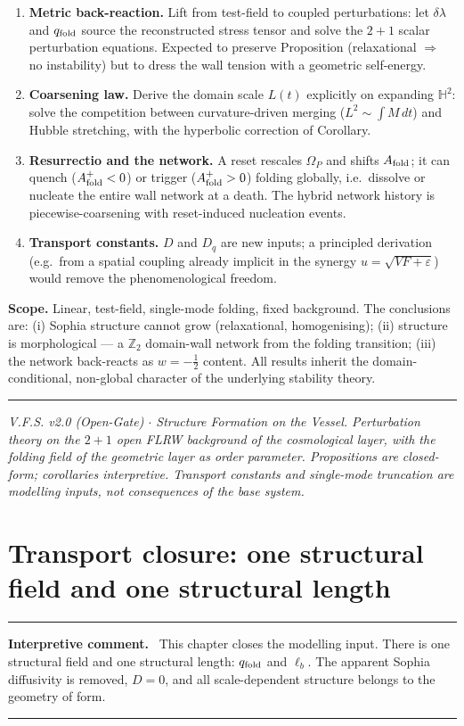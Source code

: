 \documentclass[11pt,a4paper]{article}
\newcommand{\Op}{\Omega_P}
\newcommand{\Hh}{\mathbb{H}^2}
\newcommand{\qf}{q_{\rm fold}}
\newcommand{\Af}{A_{\rm fold}}
\newcommand{\dlam}{\delta\lambda}
\newenvironment{commentbox}[1]{\begin{center}\begin{minipage}{0.90\textwidth}\hrule\vspace{0.45em}\textbf{#1.}\ }{\vspace{0.45em}\hrule\end{minipage}\end{center}}
\theoremstyle{plain}
\theoremstyle{definition}
\theoremstyle{remark}
\begin{document}
\begin{enumerate}[leftmargin=1.6em,itemsep=3pt]
\item \textbf{Metric back-reaction.} Lift from test-field to coupled perturbations: let $\dlam$ and
$\qf$ source the reconstructed stress tensor and solve the $2{+}1$ scalar perturbation equations. Expected
to preserve Proposition (relaxational $\Rightarrow$ no instability) but to dress the
wall tension with a geometric self-energy.
\item \textbf{Coarsening law.} Derive the domain scale $L(t)$ explicitly on expanding $\Hh$: solve the
competition between curvature-driven merging ($L^2\sim\int M\,dt$) and Hubble stretching, with the
hyperbolic correction of Corollary.
\item \textbf{Resurrectio and the network.} A reset rescales $\Op$ and shifts $\Af$; it can quench
($\Af^+<0$) or trigger ($\Af^+>0$) folding globally, i.e.\ dissolve or nucleate the entire wall network
at a death. The hybrid network history is piecewise-coarsening with reset-induced nucleation events.
\item \textbf{Transport constants.} $D$ and $D_q$ are new inputs; a principled derivation (e.g.\ from a
spatial coupling already implicit in the synergy $u=\sqrt{VF+\varepsilon}$) would remove the
phenomenological freedom.
\end{enumerate}

\textbf{Scope.} Linear, test-field, single-mode folding, fixed background. The conclusions are: (i)
Sophia structure cannot grow (relaxational, homogenising); (ii) structure is morphological --- a
$\mathbb Z_2$ domain-wall network from the folding transition; (iii) the network back-reacts as
$w=-\tfrac12$ content. All results inherit the domain-conditional, non-global character of the underlying
stability theory.

\vspace{0.5em}
\hrule
\smallskip
\noindent\footnotesize\emph{V.F.S. v2.0 (Open-Gate) $\cdot$ Structure Formation on the Vessel.
Perturbation theory on the $2{+}1$ open FLRW background of the cosmological layer, with the folding field
of the geometric layer as order parameter. Propositions are closed-form; corollaries interpretive.
Transport constants and single-mode truncation are modelling inputs, not consequences of the base
system.}
\newpage
\section{Transport closure: one structural field and one structural length}
\begin{commentbox}{Interpretive comment}
This chapter closes the modelling input.  There is one structural field and one structural length: $\qf$ and $\ell_b$.  The apparent Sophia diffusivity is removed, $D=0$, and all scale-dependent structure belongs to the geometry of form.
\end{commentbox}
\end{document}
